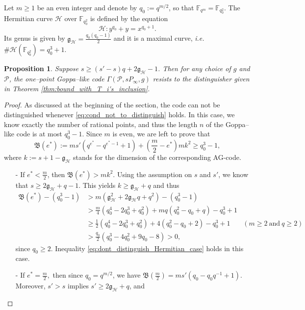 \documentclass[a4paper]{article}
\newtheorem{proposition}[thm]{Proposition}
\theoremstyle{definition}
\theoremstyle{remark}
\newcommand{\calP}{\mathcal{P}}
\newcommand{\calH}{\mathcal{H}}
\newcommand{\fqm}{\mathbb{F}_{q^m}}
\newcommand{\fqo}{\mathbb{F}_{q_0^2}}
\begin{document}
Let $m \geq 1$  be an even integer and denote by $q_0 := q^{m/2}$, so that $\fqm = \fqo$. The Hermitian curve $\calH$ over $\fqo$ is defined by the equation
$$\calH : y^{q_0}+y = x^{q_0+1}.$$
Its genus is given by $\mathfrak{g}_{\calH} = \frac{q_0(q_0-1)}{2}$ and it is a maximal curve, \emph{i.e.} $\#\calH(\fqo) = q_0^3+1$.

\begin{proposition} \label{prop:Hermitian_Goppa_like_are_secured}
    Suppose $s \geq (s'-s)q+2\mathfrak{g}_{\calH}-1$. Then for any choice of $g$ and $\calP$, the one--point Goppa--like code $\Gamma(\calP,sP_\infty,g)$ resists to the distinguisher given in Theorem \ref{thm:bound_with_T_i's_inclusion}.
\end{proposition}

\begin{proof}
    As discussed at the beginning of the section, the code can not be distinguished whenever \eqref{eq:cond_not_to_distinguish} holds. In this case, we know exactly the number of rational points, and thus the length $n$ of the Goppa--like code is at most $q_0^3-1$. Since $m$ is even, we are left to prove that 
    \begin{equation} \label{eq:dont_distinguish_Hermitian_case}
    \mathfrak{B}(e^*) := ms'(q^{e^*}-q^{e^*-1}+1) + \left( \frac{m}{2}-e^*\right)mk^2 \geq q_0^3-1,
    \end{equation}
    where $k := s+1-\mathfrak{g}_{\calH}$ stands  for the dimension of the corresponding AG-code.
    \begin{itemize}
        \item [-] If $e^* < \frac{m}{2}$, then $\mathfrak{B}(e^*) > mk^2$. Using the assumption on $s$ and $s'$, we know that $s \geq 2\mathfrak{g}_{\calH}+q-1$. This yields $k \geq \mathfrak{g}_{\calH}+q$ and thus
        \begin{align*}
\mathfrak{B}(e^*) - (q_0^3-1) 
&> m(\mathfrak{g}_{\calH}^2+2\mathfrak{g}_{\calH}q+q^2)-(q_0^3-1)&\\
& > \frac{m}{4}(q_0^4-2q_0^3+q_0^2) + mq(q_0^2-q_0+q) -q_0^3+1 &\\
& \geq \frac{1}{2}(q_0^4-2q_0^3+q_0^2)+4(q_0^2-q_0+2)-q_0^3+1 \quad &(m\geq 2 \ \mathrm{and} \ q\geq 2)&\\
& > \frac{q_0}{2} (q_0^3-4q_0^2+9q_0-8) > 0,&
        \end{align*}
        since $q_0 \geq 2$. Inequality \eqref{eq:dont_distinguish_Hermitian_case} holds in this case.
        \item[-] If $e^* = \frac{m}{2},$ then since $q_0=q^{m/2}$, we have $\mathfrak{B}\left(\frac{m}{2}\right) = ms'(q_0-q_0q^{-1}+1)$. Moreover, $s'>s$ implies $s' \geq 2\mathfrak{g}_{\calH}+q$, and

\end{itemize}
\end{proof}
\end{document}
